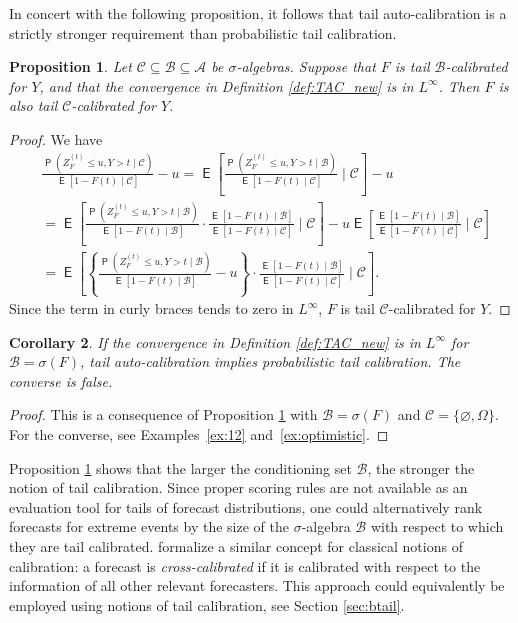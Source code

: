 \documentclass[12pt]{article}
\newcommand{\E}{\operatorname{\mathsf{E}}}
\newcommand{\Q}{\operatorname{\mathsf{P}}}
\newcommand{\Aa}{\mathcal{A}}
\newcommand{\Bb}{\mathcal{B}}
\newcommand{\Cc}{\mathcal{C}}
\newcommand{\1}{\mathbf{1}} %
\newcommand{\ZFt}{Z_{F}^{(t)}} %
\newtheorem{propo}{Proposition}
\newtheorem{corollary}[propo]{Corollary}
\theoremstyle{definition}
\begin{document}
In concert with the following proposition, it follows that tail auto-calibration is a strictly stronger requirement than probabilistic tail calibration. 

\begin{propo}\label{prop:impl1}
    Let $\Cc\subseteq \Bb \subseteq \Aa$ be $\sigma$-algebras. Suppose that $F$ is tail $\Bb$-calibrated for $Y$, and that the convergence in Definition \ref{def:TAC_new} is in $L^\infty$. Then $F$ is also tail $\Cc$-calibrated for $Y$.
\end{propo}

\begin{proof}
We have
	\begin{align*}
		&\frac{\Q(\ZFt \le u, Y > t \mid \Cc)}{\E[1 - F(t) \mid \Cc]} - u
		= \E \left[
		\frac{\Q(\ZFt \le u, Y > t \mid \Bb)}{\E[1 - F(t) \mid \Cc]}
		\;\Big|\; \Cc
		\right] - u \\
		&= \E \left[
		\frac{\Q(\ZFt \le u, Y > t \mid \Bb)}{\E[1 - F(t) \mid \Bb]} \cdot
		\frac{\E[1 - F(t) \mid \Bb]}{\E[1 - F(t) \mid \Cc]}
		\;\Big|\; \Cc
		\right]
		- u \E \left[
		\frac{\E[1 - F(t) \mid \Bb]}{\E[1 - F(t) \mid \Cc]}
		\;\Big|\; \Cc
		\right] \\
		&= \E \left[
		\left\{
		\frac{\Q(\ZFt \le u, Y > t \mid \Bb)}{\E[1 - F(t) \mid \Bb]}
		- u
		\right\} \cdot
		\frac{\E[1 - F(t) \mid \Bb]}{\E[1 - F(t) \mid \Cc]}
		\;\Big|\; \Cc
		\right].
	\end{align*}
	Since the term in curly braces tends to zero in $L^\infty$, $F$ is tail $\Cc$-calibrated for $Y$. 
\end{proof}

\begin{corollary}\label{cor}
If the convergence in Definition \ref{def:TAC_new} is in $L^\infty$ for $\Bb = \sigma(F)$, tail auto-calibration implies probabilistic tail calibration. The converse is false.
\end{corollary}
\begin{proof}
    This is a consequence of Proposition \ref{prop:impl1} with $\Bb = \sigma(F)$ and $\Cc = \{ \varnothing, \Omega \}$. For the converse, see Examples~\ref{ex:12} and~\ref{ex:optimistic}.
\end{proof}

Proposition \ref{prop:impl1} shows that the larger the conditioning set $\Bb$, the stronger the notion of tail calibration. Since proper scoring rules are not available as an evaluation tool for tails of forecast distributions, one could alternatively rank forecasts for extreme events by the size of the $\sigma$-algebra $\Bb$ with respect to which they are tail calibrated. \cite{StrahlZiegel2017} formalize a similar concept for classical notions of calibration: a forecast is \emph{cross-calibrated} if it is calibrated with respect to the information of all other relevant forecasters. This approach could equivalently be employed using notions of tail calibration, see Section \ref{sec:btail}.
\end{document}

